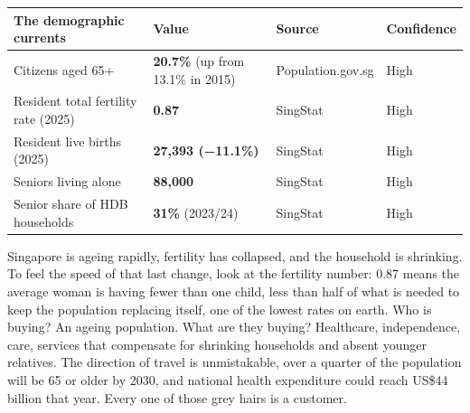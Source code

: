 \documentclass[10pt,twoside,openany]{memoir}
\renewcommand{\arraystretch}{1.1}
\begin{document}
{{{{{{{{{{{{{\def\LTcaptype{none} %
{\renewcommand{\arraystretch}{0.9}\begin{longtable}[]{@{}
  >{\raggedright\arraybackslash}p{}
  >{\raggedright\arraybackslash}p{}
  >{\raggedright\arraybackslash}p{}
  >{\raggedright\arraybackslash}p{}@{}}
\toprule\noalign{}
\begin{minipage}[b]{\linewidth}\raggedright
The demographic currents
\end{minipage} & \begin{minipage}[b]{\linewidth}\raggedright
Value
\end{minipage} & \begin{minipage}[b]{\linewidth}\raggedright
Source
\end{minipage} & \begin{minipage}[b]{\linewidth}\raggedright
Confidence
\end{minipage} \\
\midrule\noalign{}
\endhead
\bottomrule\noalign{}
\endlastfoot
Citizens aged 65+ & \textbf{20.7\%} (up from 13.1\% in 2015) &
Population.gov.sg & High \\
Resident total fertility rate (2025) & \textbf{0.87} & SingStat &
High \\
Resident live births (2025) & \textbf{27,393 (−11.1\%)} & SingStat &
High \\
Seniors living alone & \textbf{88,000} & SingStat & High \\
Senior share of HDB households & \textbf{31\%} (2023/24) & SingStat &
High \\
\end{longtable}
}

Singapore is ageing rapidly, fertility has collapsed, and the household
is shrinking. To feel the speed of that last change, look at the
fertility number: 0.87 means the average woman is having fewer than one
child, less than half of what is needed to keep the population replacing
itself, one of the lowest rates on earth. Who is buying? An ageing
population. What are they buying? Healthcare, independence, care,
services that compensate for shrinking households and absent younger
relatives. The direction of travel is unmistakable, over a quarter of
the population will be 65 or older by 2030, and national health
expenditure could reach US\$44 billion that year. Every one of those
grey hairs is a customer.

}}}}}}}}}}}}}
\end{document}
